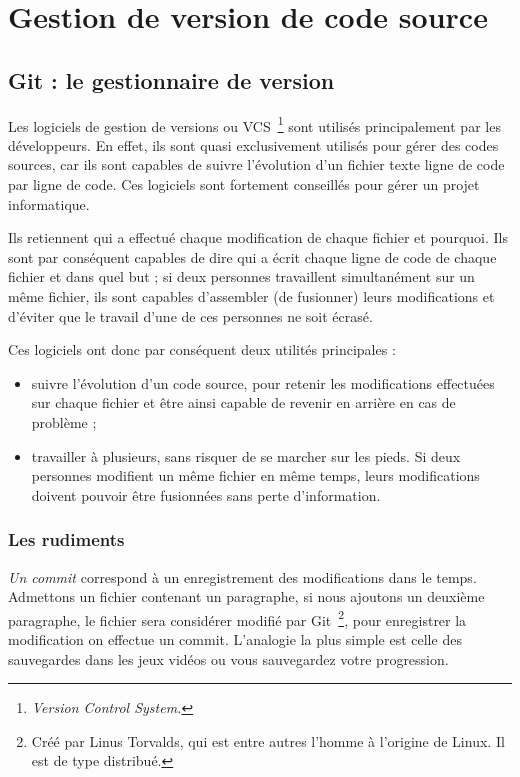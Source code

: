 \chapter{Gestion de version de code source}

\section{Git : le gestionnaire de version}

Les logiciels de gestion de versions ou VCS\, \footnote{\emph{Version Control
System.}} sont utilisés principalement par les développeurs. En effet, ils sont
quasi exclusivement utilisés pour gérer des codes sources, car ils sont
capables de suivre l’évolution d’un fichier texte ligne de code par ligne de
code. Ces logiciels sont fortement conseillés pour gérer un projet
informatique.

Ils retiennent qui a effectué chaque modification de chaque fichier et
pourquoi. Ils sont par conséquent capables de dire qui a écrit chaque ligne de
code de chaque fichier et dans quel but ; si deux personnes travaillent
simultanément sur un même fichier, ils sont capables d’assembler (de fusionner)
leurs modifications et d’éviter que le travail d’une de ces personnes ne soit
écrasé.

Ces logiciels ont donc par conséquent deux utilités principales :
\begin{itemize}
    \item suivre l’évolution d’un code source, pour retenir les modifications
effectuées sur chaque fichier et être ainsi capable de revenir en arrière en
cas de problème ;
    \item travailler à plusieurs, sans risquer de se marcher sur les pieds.
Si deux personnes modifient un même fichier en même temps, leurs modifications
doivent pouvoir être fusionnées sans perte d’information.
\end{itemize}

\subsection{Les rudiments}

\emph{Un commit} correspond à un enregistrement des modifications dans le temps.
Admettons un fichier contenant un paragraphe, si nous ajoutons un deuxième
paragraphe, le fichier sera considérer modifié par Git\, \footnote{Créé par
Linus Torvalds, qui est entre autres l’homme à l’origine de Linux. Il est de
type distribué.}, pour enregistrer la modification on effectue un commit.
L'analogie la plus simple est celle des sauvegardes dans les jeux vidéos ou
vous sauvegardez votre progression.

